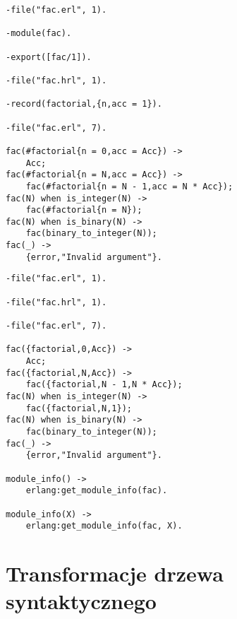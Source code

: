 \begin{lstlisting}[style=erlang, caption=Moduł fac po pierwszym przetworzeniu, label=facP]
-file("fac.erl", 1).

-module(fac).

-export([fac/1]).

-file("fac.hrl", 1).

-record(factorial,{n,acc = 1}).

-file("fac.erl", 7).

fac(#factorial{n = 0,acc = Acc}) ->
    Acc;
fac(#factorial{n = N,acc = Acc}) ->
    fac(#factorial{n = N - 1,acc = N * Acc});
fac(N) when is_integer(N) ->
    fac(#factorial{n = N});
fac(N) when is_binary(N) ->
    fac(binary_to_integer(N));
fac(_) ->
    {error,"Invalid argument"}.
\end{lstlisting}

\begin{lstlisting}[style=erlang, caption=Moduł fac po drugim przetworzeniu, label=facE]
-file("fac.erl", 1).

-file("fac.hrl", 1).

-file("fac.erl", 7).

fac({factorial,0,Acc}) ->
    Acc;
fac({factorial,N,Acc}) ->
    fac({factorial,N - 1,N * Acc});
fac(N) when is_integer(N) ->
    fac({factorial,N,1});
fac(N) when is_binary(N) ->
    fac(binary_to_integer(N));
fac(_) ->
    {error,"Invalid argument"}.

module_info() ->
    erlang:get_module_info(fac).

module_info(X) ->
    erlang:get_module_info(fac, X).
\end{lstlisting}
\section{Transformacje drzewa syntaktycznego}
\label{sec:compilationSyntaxtree}


